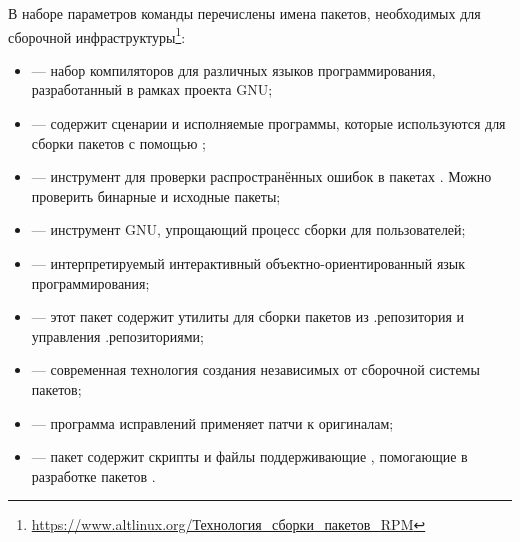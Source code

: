 

В наборе параметров команды  перечислены имена пакетов, необходимых для сборочной 
инфраструктуры\footnote{\href{https://www.altlinux.org/Технология_сборки_пакетов_RPM}{https://www.altlinux.org/Технология\_сборки\_пакетов\_RPM}}:

\begin{itemize}
	\item {} --- набор компиляторов для различных языков программирования, разработанный в рамках проекта GNU;
	\item {} --- содержит сценарии и исполняемые программы, которые используются для сборки пакетов с помощью ;
	\item {} --- инструмент для проверки распространённых ошибок в пакетах . Можно проверить бинарные и исходные пакеты;
	\item {} --- инструмент GNU, упрощающий процесс сборки для пользователей;
	\item {} --- интерпретируемый интерактивный объектно-ориентированный язык программирования;
	\item {} --- этот пакет содержит утилиты для сборки пакетов  из .репозитория и управления .репозиториями;
	\item {} --- современная технология создания независимых от сборочной системы пакетов;
	\item {} --- программа исправлений применяет патчи к оригиналам;
	\item {} --- пакет содержит скрипты и файлы поддерживающие , помогающие в разработке пакетов .
\end{itemize}


